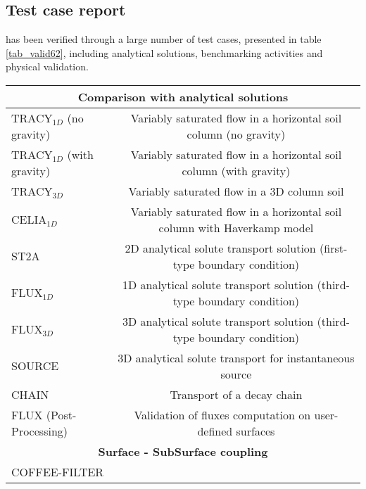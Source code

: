 \newpage

\subsection{Test case report}
\estel has been verified through a large number of test cases, presented in table \ref{tab_valid62}, including analytical solutions, benchmarking activities and physical validation.

\begin{table}[h!]
\begin{center}
\renewcommand{\arraystretch}{1.2}
\tiny
\begin {tabular} {l|c}
% 
    \hline 
    \multicolumn{2}{c}{\textbf{Comparison with analytical solutions}}\\       
    \hline 
    \hline 
TRACY$_{1D}$ (no gravity) &
Variably saturated flow in a horizontal soil column (no gravity)\\
TRACY$_{1D}$ (with gravity) &
Variably saturated flow in a horizontal soil column (with gravity)\\
TRACY$_{3D}$        &
Variably saturated flow in a 3D column soil\\
CELIA$_{1D}$ &
Variably saturated flow in a horizontal soil column with Haverkamp model\\
ST2A        &
2D analytical solute transport solution (first-type boundary condition)\\
FLUX$_{1D}$        &
1D analytical solute transport solution (third-type boundary condition)\\
FLUX$_{3D}$        &
3D analytical solute transport solution (third-type boundary condition)\\
SOURCE        &
3D analytical solute transport for instantaneous source\\
CHAIN        &
Transport of a decay chain\\ 
FLUX (Post-Processing) &
Validation of fluxes computation on user-defined surfaces\\
\hline
\multicolumn{2}{c}{\textbf{Surface - SubSurface coupling}}\\
\hline
\hline
COFFEE-FILTER        &

\end{tabular}
\end{center}
\end{table}
